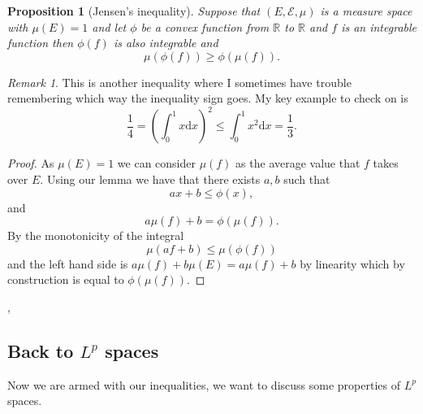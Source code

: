 \documentclass[11pt]{article}
\newtheorem{prp}[thm]{Proposition}
\theoremstyle{definition}
\theoremstyle{remark}
\newtheorem{remark}[thm]{Remark}
\begin{document}
\begin{prp}[Jensen's inequality]
Suppose that $(E, \mathcal{E}, \mu)$ is a measure space with $\mu(E) = 1$ and let $\phi$ be a convex function from $\mathbb{R}$ to $\mathbb{R}$ and $f$ is an integrable function then $\phi(f)$ is also integrable and 
\[ \mu(\phi(f)) \geq \phi(\mu(f)). \] 
\end{prp}
\begin{remark}
This is another inequality where I sometimes have trouble remembering which way the inequality sign goes. My key example to check on is \[ \frac{1}{4} = \left( \int_0^1 x \mathrm{d}x \right)^2 \leq \int_0^1 x^2 \mathrm{d}x = \frac{1}{3}. \]
\end{remark}
\begin{proof}
As $\mu(E)=1$ we can consider $\mu(f)$ as the average value that $f$ takes over $E$. Using our lemma we have that there exists $a,b$ such that
\[ ax+b \leq \phi(x), \] and \[a\mu(f)+b = \phi(\mu(f)).\] By the monotonicity of the integral
\[ \mu(af + b) \leq \mu(\phi(f)) \] and the left hand side is $a \mu(f) +b \mu(E)= a \mu(f) +b$ by linearity which by construction is equal to $\phi(\mu(f))$.
\end{proof},

\subsection{Back to $L^p$ spaces}
 Now we are armed with our inequalities, we want to discuss some properties of $L^p$ spaces. 
\end{document}
